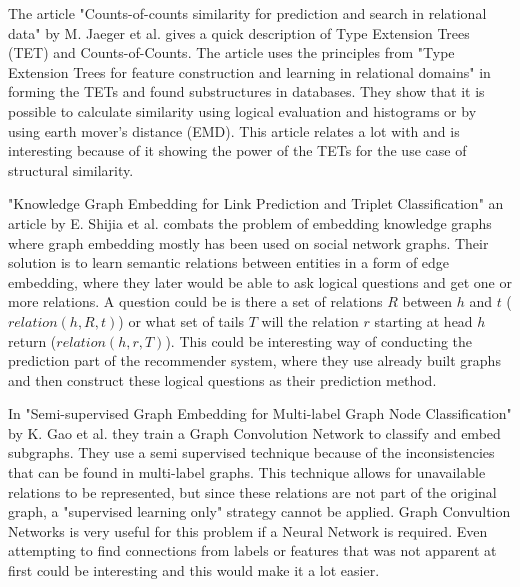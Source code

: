 The article "Counts-of-counts similarity for prediction and search in relational data" by M. Jaeger et al.\cite{jaeger2019counts} gives a quick description of Type Extension Trees (TET) and Counts-of-Counts. The article uses the principles from "Type Extension Trees for feature construction and learning in relational domains" in forming the TETs and found substructures in databases. They show that it is possible to calculate similarity using logical evaluation and histograms or by using earth mover's distance (EMD). This article relates a lot with \cite{JAEGER201330} and is interesting because of it showing the power of the TETs for the use case of structural similarity.

"Knowledge Graph Embedding for Link Prediction and Triplet Classification" an article by E. Shijia et al. \cite{10.1007/978-981-10-3168-7_23} combats the problem of embedding knowledge graphs where graph embedding mostly has been used on social network graphs. Their solution is to learn semantic relations between entities in a form of edge embedding, where they later would be able to ask logical questions and get one or more relations. A question could be is there a set of relations $R$ between $h$ and $t$ ($relation(h,R,t)$) or what set of tails $T$ will the relation $r$ starting at head $h$ return ($relation(h,r,T)$). This could be interesting way of conducting the prediction part of the recommender system, where they use already built graphs and then construct these logical questions as their prediction method.

In "Semi-supervised Graph Embedding for Multi-label Graph Node Classification" by K. Gao et al.\cite{10.1007/978-3-030-34223-4_35} they train a Graph Convolution Network to classify and embed subgraphs. They use a semi supervised technique because of the inconsistencies that can be found in multi-label graphs. This technique allows for unavailable relations to be represented, but since these relations are not part of the original graph, a "supervised learning only" strategy cannot be applied. Graph Convultion Networks is very useful for this problem if a Neural Network is required. Even attempting to find connections from labels or features that was not apparent at first could be interesting and this would make it a lot easier.
